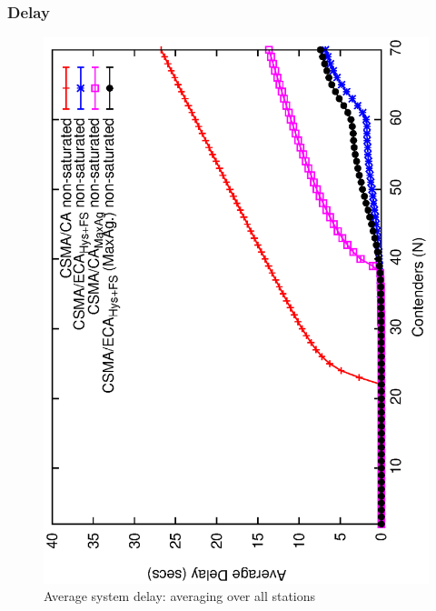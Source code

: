 \documentclass[a4paper,journal]{IEEEtran}
\begin{document}
	
	\subsubsection{Delay}
	
	\begin{figure}[tb]
		\centering
		\includegraphics[width=0.7\linewidth,angle=-90]{figures/unsaturated/queueingDelay/queueingDelay-multiplot.eps}
		\caption{Average system delay: averaging over all stations}
		\label{fig:serviceTime-unsat}
	\end{figure}
	
\end{document}
